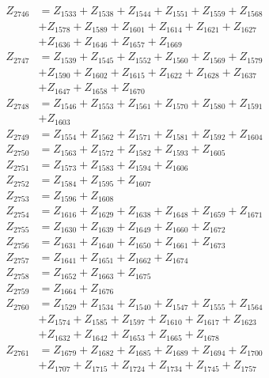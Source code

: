 \begin{multicols}{2}
\begin{align}
Z_{2746} &= Z_{1533} + Z_{1538} + Z_{1544} + Z_{1551} + Z_{1559} + Z_{1568}  \nonumber \\
&+ Z_{1578} + Z_{1589} + Z_{1601} + Z_{1614} + Z_{1621} + Z_{1627}  \nonumber \\
&+ Z_{1636} + Z_{1646} + Z_{1657} + Z_{1669} \nonumber \\
Z_{2747} &= Z_{1539} + Z_{1545} + Z_{1552} + Z_{1560} + Z_{1569} + Z_{1579}  \nonumber \\
&+ Z_{1590} + Z_{1602} + Z_{1615} + Z_{1622} + Z_{1628} + Z_{1637}  \nonumber \\
&+ Z_{1647} + Z_{1658} + Z_{1670} \nonumber \\
Z_{2748} &= Z_{1546} + Z_{1553} + Z_{1561} + Z_{1570} + Z_{1580} + Z_{1591}  \nonumber \\
&+ Z_{1603} \nonumber \\
Z_{2749} &= Z_{1554} + Z_{1562} + Z_{1571} + Z_{1581} + Z_{1592} + Z_{1604} \nonumber \\
Z_{2750} &= Z_{1563} + Z_{1572} + Z_{1582} + Z_{1593} + Z_{1605} \nonumber \\
Z_{2751} &= Z_{1573} + Z_{1583} + Z_{1594} + Z_{1606} \nonumber \\
Z_{2752} &= Z_{1584} + Z_{1595} + Z_{1607} \nonumber \\
Z_{2753} &= Z_{1596} + Z_{1608} \nonumber \\
Z_{2754} &= Z_{1616} + Z_{1629} + Z_{1638} + Z_{1648} + Z_{1659} + Z_{1671} \nonumber \\
Z_{2755} &= Z_{1630} + Z_{1639} + Z_{1649} + Z_{1660} + Z_{1672} \nonumber \\
Z_{2756} &= Z_{1631} + Z_{1640} + Z_{1650} + Z_{1661} + Z_{1673} \nonumber \\
Z_{2757} &= Z_{1641} + Z_{1651} + Z_{1662} + Z_{1674} \nonumber \\
Z_{2758} &= Z_{1652} + Z_{1663} + Z_{1675} \nonumber \\
Z_{2759} &= Z_{1664} + Z_{1676} \nonumber \\
Z_{2760} &= Z_{1529} + Z_{1534} + Z_{1540} + Z_{1547} + Z_{1555} + Z_{1564}  \nonumber \\
&+ Z_{1574} + Z_{1585} + Z_{1597} + Z_{1610} + Z_{1617} + Z_{1623}  \nonumber \\
&+ Z_{1632} + Z_{1642} + Z_{1653} + Z_{1665} + Z_{1678} \nonumber \\
Z_{2761} &= Z_{1679} + Z_{1682} + Z_{1685} + Z_{1689} + Z_{1694} + Z_{1700}  \nonumber \\
&+ Z_{1707} + Z_{1715} + Z_{1724} + Z_{1734} + Z_{1745} + Z_{1757}  \nonumber \\

\end{align}
\end{multicols}
